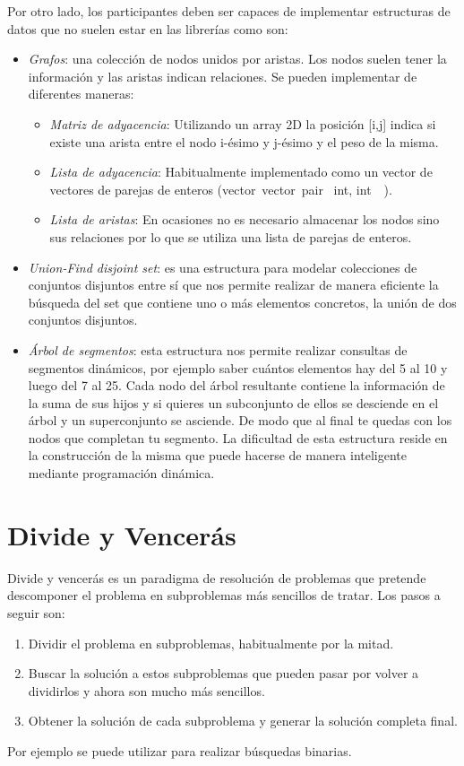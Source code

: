Por otro lado, los participantes deben ser capaces de implementar
estructuras de datos que no suelen estar en las librerías como son:
\begin{itemize}
\item \emph{Grafos}: una colección de nodos unidos por aristas. Los
  nodos suelen tener la información y las aristas indican
  relaciones. Se pueden implementar de diferentes maneras:
  \begin{itemize}
  \item \emph{Matriz de adyacencia}: Utilizando un array 2D la
    posición [i,j] indica si existe una arista entre el nodo i-ésimo y
    j-ésimo y el peso de la misma.
  \item \emph{Lista de adyacencia}: Habitualmente implementado como un
    vector de vectores de parejas de enteros (vector\lt~vector\lt~pair\lt~
    int, int\gt~\gt~\gt).
  \item \emph{Lista de aristas}: En ocasiones no es necesario
    almacenar los nodos sino sus relaciones por lo que se utiliza una
    lista de parejas de enteros.
  \end{itemize}
\item \emph{Union-Find disjoint set}: es una estructura para modelar
  colecciones de conjuntos disjuntos entre sí que nos permite realizar
  de manera eficiente la búsqueda del set que contiene uno o más
  elementos concretos, la unión de dos conjuntos disjuntos.
\item \emph{Árbol de segmentos}: esta estructura nos permite realizar
  consultas de segmentos dinámicos, por ejemplo saber cuántos
  elementos hay del 5 al 10 y luego del 7 al 25. Cada nodo del árbol
  resultante contiene la información de la suma de sus hijos y si
  quieres un subconjunto de ellos se desciende en el árbol y un
  superconjunto se asciende. De modo que al final te quedas con los
  nodos que completan tu segmento. La dificultad de esta estructura
  reside en la construcción de la misma que puede hacerse de manera
  inteligente mediante programación dinámica.
\end{itemize}

\section{Divide y Vencerás}
\label{sec:divideyvenceras}

Divide y vencerás es un paradigma de resolución de problemas que
pretende descomponer el problema en subproblemas más sencillos de
tratar. Los pasos a seguir son:
\begin{enumerate}
\item Dividir el problema en subproblemas, habitualmente por la mitad.
\item Buscar la solución a estos subproblemas que pueden pasar por
  volver a dividirlos y ahora son mucho más sencillos.
\item Obtener la solución de cada subproblema y generar la solución
  completa final.
\end{enumerate}
Por ejemplo se puede utilizar para realizar búsquedas binarias.


